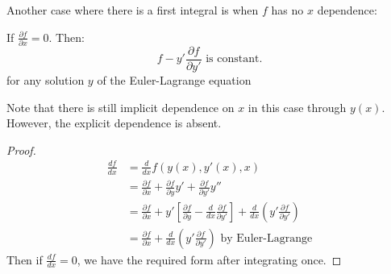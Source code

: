 \documentclass[../Main.tex]{subfiles}
\begin{document}
Another case where there is a first integral is when $f$ has no $x$ dependence:
\begin{proposition}
    If $\frac{\partial f}{\partial x} = 0$. Then:
    \begin{equation}
        f - y' \frac{\partial f}{\partial y'} \text{ is constant.}
        \label{eqnFirstIntegral2}
    \end{equation}
    for any solution $y$ of the Euler-Lagrange equation
    \label{propFirstIntegral}
\end{proposition}
\begin{remark}
    Note that there is still implicit dependence on $x$ in this case through $y(x)$. However, the explicit dependence is absent.
\end{remark}
\begin{proof}
    \begin{align*}
        \frac{df}{dx} &= \frac{d}{dx} f(y(x), y'(x), x) \\
        &= \frac{\partial f}{\partial x} + \frac{\partial f}{\partial y}y' + \frac{\partial f}{\partial y'} y'' \\
        &= \frac{\partial f}{\partial x} + y'\left[\frac{\partial f}{\partial y} - \frac{d}{dx} \frac{\partial f}{\partial y'}\right] + \frac{d}{dx} \left(y' \frac{\partial f}{\partial y'}\right) \\
        &= \frac{\partial f}{\partial x} + \frac{d}{dx} \left(y' \frac{\partial f}{\partial y'}\right) \text{ by Euler-Lagrange}
    \end{align*}
    Then if $\frac{df}{dx} = 0$, we have the required form after integrating once.
\end{proof}
\end{document}
